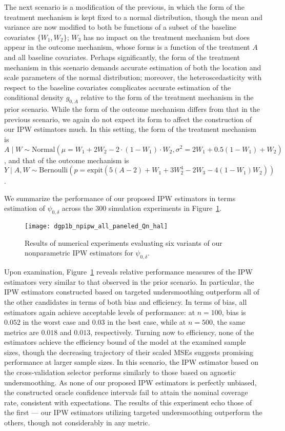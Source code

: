 The next scenario is a modification of the previous, in which the form of the
treatment mechanism is kept fixed to a normal distribution, though the mean and
variance are now modified to both be functions of a subset of the baseline
covariates $\{W_1, W_2\}$; $W_3$ has no impact on the treatment mechanism but
does appear in the outcome mechanism, whose forms is a function of the treatment
$A$ and all baseline covariates. Perhaps significantly, the form of the
treatment mechanism in this scenario demands accurate estimation of both the
location and scale parameters of the normal distribution; moreover, the
heteroscedasticity with respect to the baseline covariates complicates accurate
estimation of the conditional density $g_{0,A}$ relative to the form of the
treatment mechanism in the prior scenario. While the form of the outcome
mechanism differs from that in the previous scenario, we again do not expect its
form to affect the construction of our IPW estimators much. In this setting, the
form of the treatment mechanism is $A \mid W \sim \text{Normal}\left(\mu = W_1
+ 2 W_2 - 2 \cdot (1 - W_1) \cdot W_2, \sigma^2 = 2 W_1 + 0.5 (1 - W_1) + W_2
\right)$, and that of the outcome mechanism is $Y \mid A, W \sim
\text{Bernoulli}\left(p = \text{expit}(5 (A - 2) + W_1 + 3 W_2^4 - 2 W_3 - 4 (1
- W_1) W_2)\right)$.

We summarize the performance of our proposed IPW estimators in terms estimation
of $\psi_{0,\delta}$ across the $300$ simulation experiments in
Figure~\ref{fig:dgp1b_npipw}.
\begin{figure}[H]
  \centering
  \texttt{[image: dgp1b\_npipw\_all\_paneled\_Qn\_hal]}
  \caption{Results of numerical experiments evaluating six variants of our
  nonparametric IPW estimators for $\psi_{0,\delta}$.}
  \label{fig:dgp1b_npipw}
\end{figure}
Upon examination, Figure~\ref{fig:dgp1b_npipw} reveals relative performance
measures of the IPW estimators very similar to that observed in the prior
scenario. In particular, the IPW estimators constructed based on targeted
undersmoothing outperform all of the other candidates in terms of both bias and
efficiency. In terms of bias, all estimators again achieve acceptable levels of
performance: at $n=100$, bias is $0.052$ in the worst case and $0.03$ in the
best case, while at $n=500$, the same metrics are $0.018$ and $0.013$,
respectively. Turning now to efficiency, none of the estimators achieve the
efficiency bound of the model at the examined sample sizes, though the
decreasing trajectory of their scaled MSEs suggests promising performance at
larger sample sizes. In this scenario, the IPW estimator based on the
cross-validation selector performs similarly to those based on agnostic
undersmoothing. As none of our proposed IPW estimators is perfectly unbiased,
the constructed oracle confidence intervals fail to attain the nominal coverage
rate, consistent with expectations. The results of this experiment echo those of
the first --- our IPW estimators utilizing targeted undersmoothing outperform
the others, though not considerably in any metric.

